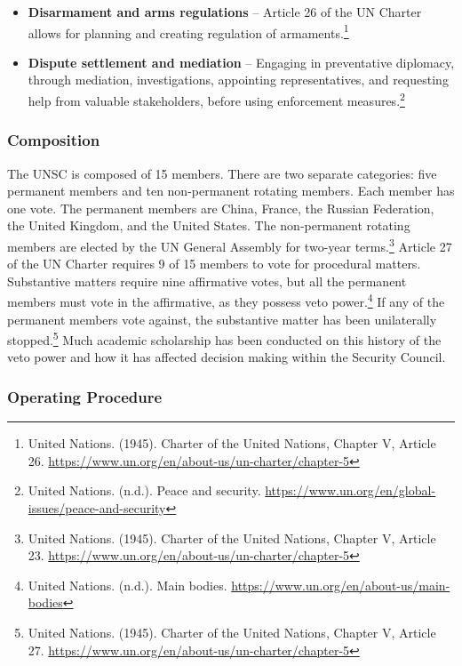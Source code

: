 \begin{itemize}
  \item \textbf{Disarmament and arms regulations} -- Article 26 of the UN Charter allows for planning and creating regulation of armaments.\footnote{United Nations. (1945). Charter of the United Nations, Chapter V, Article 26. \url{https://www.un.org/en/about-us/un-charter/chapter-5}}
  \item \textbf{Dispute settlement and mediation} -- Engaging in preventative diplomacy, through mediation, investigations, appointing representatives, and requesting help from valuable stakeholders, before using enforcement measures.\footnote{United Nations. (n.d.). Peace and security. \url{https://www.un.org/en/global-issues/peace-and-security}}
\end{itemize}

\subsubsection{Composition}

The UNSC is composed of 15 members. There are two separate categories: five permanent members and ten non-permanent rotating members. Each member has one vote. The permanent members are China, France, the Russian Federation, the United Kingdom, and the United States. The non-permanent rotating members are elected by the UN General Assembly for two-year terms.\footnote{United Nations. (1945). Charter of the United Nations, Chapter V, Article 23. \url{https://www.un.org/en/about-us/un-charter/chapter-5}} Article 27 of the UN Charter requires 9 of 15 members to vote for procedural matters. Substantive matters require nine affirmative votes, but all the permanent members must vote in the affirmative, as they possess veto power.\footnote{United Nations. (n.d.). Main bodies. \url{https://www.un.org/en/about-us/main-bodies}} If any of the permanent members vote against, the substantive matter has been unilaterally stopped.\footnote{United Nations. (1945). Charter of the United Nations, Chapter V, Article 27. \url{https://www.un.org/en/about-us/un-charter/chapter-5}} Much academic scholarship has been conducted on this history of the veto power and how it has affected decision making within the Security Council.

\subsubsection{Operating Procedure}

